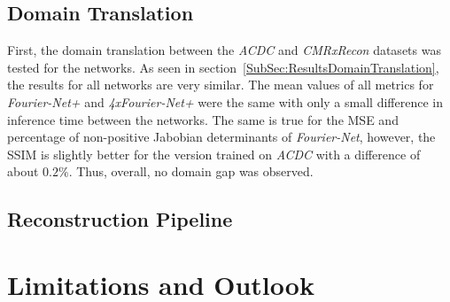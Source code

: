\subsection{Domain Translation} \label{SubSec:DiscussionDomainTranslation}
First, the domain translation between the \emph{ACDC} and \emph{CMRxRecon} datasets was tested for the networks. As seen in section~\ref{SubSec:ResultsDomainTranslation}, the results for all networks are very similar. The mean values of all metrics for \emph{Fourier-Net+} and \emph{4xFourier-Net+} were the same with only a small difference in inference time between the networks. The same is true for the MSE and percentage of non-positive Jabobian determinants of \emph{Fourier-Net}, however, the SSIM is slightly better for the version trained on \emph{ACDC} with a difference of about $0.2 \%$. Thus, overall, no domain gap was observed.

\subsection{Reconstruction Pipeline} \label{SubSec:DiscussionReconstructionPipeline}


\section{Limitations and Outlook}
